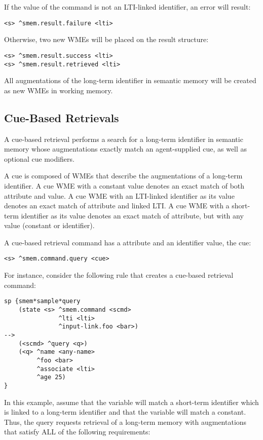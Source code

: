 If the value of the command is not an LTI-linked identifier, an error will result:

\begin{verbatim}
<s> ^smem.result.failure <lti>
\end{verbatim}

Otherwise, two new WMEs will be placed on the result structure:

\begin{verbatim}
<s> ^smem.result.success <lti>
<s> ^smem.result.retrieved <lti>
\end{verbatim}

All augmentations of the long-term identifier in semantic memory will be created as new WMEs in working memory.

\subsection{Cue-Based Retrievals}

A cue-based retrieval performs a search for a long-term identifier in semantic memory whose augmentations exactly match an agent-supplied cue, as well as optional cue modifiers.

A cue is composed of WMEs that describe the augmentations of a long-term identifier.
A cue WME with a constant value denotes an exact match of both attribute and value.
A cue WME with an LTI-linked identifier as its value denotes an exact match of attribute and linked LTI.
A cue WME with a short-term identifier as its value denotes an exact match of attribute, but with any value (constant or identifier).

A cue-based retrieval command has a  attribute and an identifier value, the cue:

\begin{verbatim}
<s> ^smem.command.query <cue>
\end{verbatim}

For instance, consider the following rule that creates a cue-based retrieval command:

\begin{verbatim}
sp {smem*sample*query
    (state <s> ^smem.command <scmd>
               ^lti <lti>
               ^input-link.foo <bar>)
-->
    (<scmd> ^query <q>)
    (<q> ^name <any-name>
         ^foo <bar>
         ^associate <lti>
         ^age 25)
}
\end{verbatim}

In this example, assume that the  variable will match a short-term identifier which is linked to a long-term identifier and that the  variable will match a constant.
Thus, the query requests retrieval of a long-term memory with augmentations that satisfy ALL of the following requirements:


